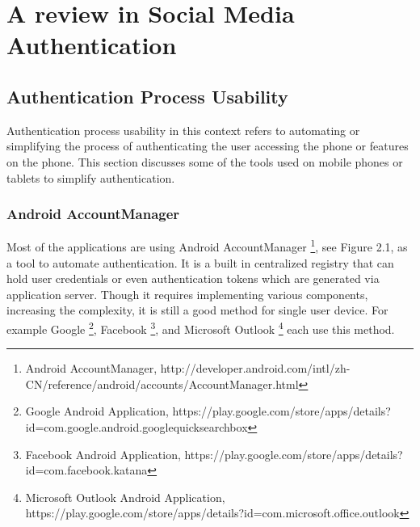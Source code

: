 
\chapter{A review in Social Media Authentication} %




\ifpdf
    \graphicspath{{X/figures/PNG/}{X/figures/PDF/}{X/figures/}}
\else
    \graphicspath{{X/figures/EPS/}{X/figures/}}
\fi



\section{Authentication Process Usability}
Authentication process usability in this context refers to automating or simplifying the process of authenticating the user accessing the phone or features on the phone. This section discusses some of the tools used on mobile phones or tablets to simplify authentication.

\subsection{Android AccountManager}
Most of the applications are using Android AccountManager \footnote[1]{Android AccountManager, http://developer.android.com/intl/zh-CN/reference/android/accounts/AccountManager.html}, see Figure 2.1, as a tool to automate authentication. It is a built in centralized registry that can hold user credentials or even authentication tokens which are generated via application server. Though it requires implementing various components, increasing the complexity, it is still a good method for single user device. For example Google \footnote[2]{Google Android Application, https://play.google.com/store/apps/details?id=com.google.android.googlequicksearchbox}, Facebook \footnote[3]{Facebook Android Application, https://play.google.com/store/apps/details?id=com.facebook.katana}, and Microsoft Outlook \footnote[4]{Microsoft Outlook Android Application, https://play.google.com/store/apps/details?id=com.microsoft.office.outlook} each use this method. 


